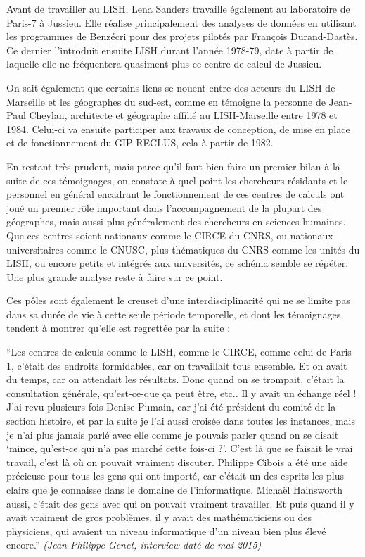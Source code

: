 Avant de travailler au LISH, Lena Sanders travaille également au laboratoire de Paris-7 à Jussieu. Elle réalise principalement des analyses de données en utilisant les programmes de Benzécri pour des projets pilotés par François Durand-Dastès. Ce dernier l'introduit ensuite LISH durant l'année 1978-79, date à partir de laquelle elle ne fréquentera quasiment plus ce centre de calcul de Jussieu.

On sait également que certains liens se nouent entre des acteurs du LISH de Marseille et les géographes du sud-est, comme en témoigne la personne de Jean-Paul Cheylan, architecte et géographe affilié au LISH-Marseille entre 1978 et 1984. Celui-ci va ensuite participer aux travaux de conception, de mise en place et de fonctionnement du GIP RECLUS, cela à partir de 1982.

En restant très prudent, mais parce qu'il faut bien faire un premier bilan à la suite de ces témoignages, on constate à quel point les chercheurs résidants et le personnel en général encadrant le fonctionnement de ces centres de calculs ont joué un premier rôle important dans l’accompagnement de la plupart des géographes, mais aussi plus généralement des chercheurs en sciences humaines. Que ces centres soient nationaux comme le CIRCE du CNRS, ou nationaux universitaires comme le CNUSC, plus thématiques du CNRS comme les unités du LISH, ou encore petits et intégrés aux universités, ce schéma semble se répéter. Une plus grande analyse reste à faire sur ce point.

Ces pôles sont également le creuset d'une interdisciplinarité qui ne se limite pas dans sa durée de vie à cette seule période temporelle, et dont les témoignages tendent à montrer qu'elle est regrettée par la suite :

\enquote{Les centres de calculs comme le LISH, comme le CIRCE, comme celui de Paris 1, c'était des endroits formidables, car on travaillait tous ensemble. Et on avait du temps, car on attendait les résultats. Donc quand on se trompait, c'était la consultation générale, qu'est-ce-que ça peut être, etc..  Il y avait un échange réel ! J'ai revu plusieurs fois Denise Pumain, car j'ai été président du comité de la section histoire, et par la suite je l'ai aussi croisée dans toutes les instances, mais je n'ai plus jamais parlé avec elle comme je pouvais parler quand on se disait \enquote{mince, qu'est-ce qui n'a pas marché cette fois-ci ?}. C'est là que se faisait le vrai travail, c'est là où on pouvait vraiment discuter. Philippe Cibois a été une aide précieuse pour tous les gens qui ont importé, car c'était un des esprits les plus clairs que je connaisse dans le domaine de l'informatique. Michaël Hainsworth aussi, c'était des gens avec qui on pouvait vraiment travailler. Et puis quand il y avait vraiment de gros problèmes, il y avait des mathématiciens ou des physiciens, qui avaient un niveau informatique d'un niveau bien plus élevé encore.} \textit{(Jean-Philippe Genet, interview daté de mai 2015)}


